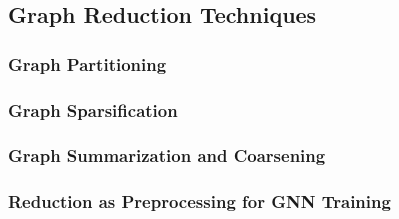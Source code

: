 \subsection{Graph Reduction Techniques}
\label{sec:relwork:reduction}

\subsubsection{Graph Partitioning}
\label{sec:relwork:reduction:partitioning}

\subsubsection{Graph Sparsification}
\label{sec:relwork:reduction:sparsification}

\subsubsection{Graph Summarization and Coarsening}
\label{sec:relwork:reduction:summarization}

\subsubsection{Reduction as Preprocessing for GNN Training}
\label{sec:relwork:reduction:forgnn}
